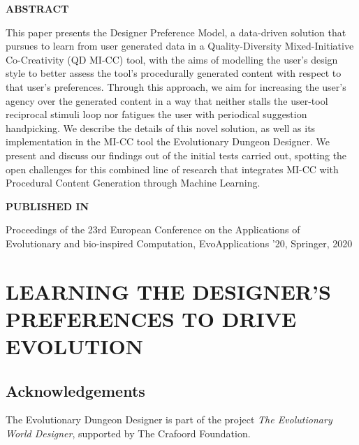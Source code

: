 \graphicspath{{included-papers-tex/paper-5/figures/}}


\normalfont
\textbf{\textsc{ABSTRACT}}

This paper presents the Designer Preference Model, a data-driven solution that pursues to learn from user generated data in a Quality-Diversity Mixed-Initiative Co-Creativity (QD MI-CC) tool, with the aims of modelling the user's design style to better assess the tool's procedurally generated content with respect to that user's preferences. Through this approach, we aim for increasing the user's agency over the generated content in a way that neither stalls the user-tool reciprocal stimuli loop nor fatigues the user with periodical suggestion handpicking. We describe the details of this novel solution, as well as its implementation in the MI-CC tool the Evolutionary Dungeon Designer. We present and discuss our findings out of the initial tests carried out, spotting the open challenges for this combined line of research that integrates MI-CC with Procedural Content Generation through Machine Learning.

\textbf{\textsc{PUBLISHED IN}}

Proceedings of the 23rd European Conference on the Applications of Evolutionary and bio-inspired Computation, EvoApplications '20, Springer, 2020

\section*{LEARNING THE DESIGNER'S PREFERENCES TO DRIVE EVOLUTION}








\subsection*{Acknowledgements}
 The Evolutionary Dungeon Designer is part of the project \textit{The Evolutionary World Designer}, supported by The Crafoord Foundation.
 
